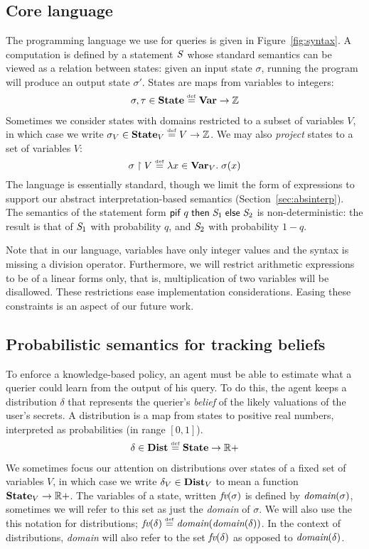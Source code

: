 \subsection{Core language}
The programming language we use for queries is given in
Figure~\ref{fig:syntax}.  A computation is defined by a statement
$\mathit{S}$ whose standard semantics can be viewed as a relation between
states: given an input state $\sigma$, running the program will
produce an output state $\sigma'$.  States are maps from variables to
integers:
$$\begin{array}{l}
\sigma, \tau \in \textbf{State} \stackrel{\smash{\scriptscriptstyle \mathrm{def}}}= \textbf{Var} \rightarrow \mathbb{Z}
\end{array}$$
Sometimes we consider states with domains restricted to a
subset of variables $V$, in which case we write $\sigma_V \in \textbf{State}_V \stackrel{\smash{\scriptscriptstyle \mathrm{def}}}= V
\rightarrow \mathbb{Z}$.  We may also \emph{project}
states to a set of variables $V$:
\[\sigma \upharpoonright V \stackrel{\smash{\scriptscriptstyle \mathrm{def}}}= \lambda x \in \textbf{Var}_V . \; \sigma(x)\]
The language is essentially standard, though
we limit the form of expressions to support our abstract 
interpretation-based semantics (Section~\ref{sec:absinterp}).
The semantics of the statement form $\mathsf{pif}\;{q}\;\mathsf{then}\;{\mathit{S}_1}\;\mathsf{else}\;{\mathit{S}_2}$ is
non-deterministic: the result is that of $\mathit{S}_1$ with probability
$q$, and $\mathit{S}_2$ with probability $1 - q$.

Note that in our language, variables have only integer values and the
syntax is missing a division operator. Furthermore, we will restrict
arithmetic expressions to be of a linear forms only, that is,
multiplication of two variables will be disallowed. These restrictions
ease implementation considerations. Easing these constraints is an
aspect of our future work.

\subsection{Probabilistic semantics for tracking beliefs}
\label{sec:clarkson-semantics}

To enforce a knowledge-based policy, an agent must be able to
estimate what a querier could learn from the output of his query.  To
do this, the agent keeps a distribution $\delta$ that represents
the querier's \emph{belief} of the likely valuations of the user's
secrets.  A distribution is a map from states to positive real
numbers, interpreted as probabilities (in range $[0,1]$).
$$\begin{array}{l}
\delta \in \textbf{Dist} \stackrel{\smash{\scriptscriptstyle \mathrm{def}}}= \textbf{State} \rightarrow \mathbb{R}+
\end{array}$$
We sometimes focus our attention on distributions over states of a
fixed set of variables $V$, in which case we write $\delta_V \in
\textbf{Dist}_V$ to mean a function $\textbf{State}_V \rightarrow \mathbb{R}+$.  The
variables of a state, written $ \textit{fv}(\sigma) $ is defined by $
\textit{domain}(\sigma) $, sometimes we will refer to this set as just the
\emph{domain} of $ \sigma $. We will also use the this notation for
distributions; $ \textit{fv}(\delta) \stackrel{\smash{\scriptscriptstyle \mathrm{def}}}= \textit{domain}(\textit{domain}(\delta)) $. In the
context of distributions, \emph{domain} will also refer to the set $
\textit{fv}(\delta) $ as opposed to $ \textit{domain}(\delta) $.

